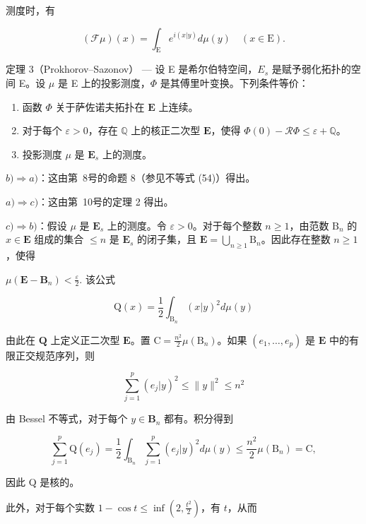 测度时，有

\[
(\mathcal {F} \mu) (x) = \int_ {\mathrm{E}} e ^ {i (x | y)} d \mu (y) \quad (x \in \mathrm{E}).\tag{64}
\]

定理 3（Prokhorov--Sazonov） --- 设 E 是希尔伯特空间，\(E_{s}\) 是赋予弱化拓扑的空间 E。设 \(\mu\) 是 E 上的投影测度，\(\Phi\) 是其傅里叶变换。下列条件等价：

\begin{enumerate}
\def\labelenumi{\alph{enumi})}
\item
  函数 \(\Phi\) 关于萨佐诺夫拓扑在 \(\mathbf{E}\) 上连续。
\item
  对于每个 \(\varepsilon > 0\)，存在 \(\mathbb{Q}\) 上的核正二次型 \(\mathbf{E}\)，使得 \(\Phi(0) - \mathcal{R}\Phi \leqslant \varepsilon + \mathbb{Q}\)。
\item
  投影测度 \(\mu\) 是 \(\mathbf{E}_s\) 上的测度。
\end{enumerate}

\(b) \Rightarrow a)\)：这由第~8号的命题 8（参见不等式 (54)）得出。

\(a) \Rightarrow c)\)：这由第~10号的定理 2 得出。

\(c) \Rightarrow b)\)：假设 \(\mu\) 是 \(\mathbf{E}_s\) 上的测度。令 \(\varepsilon > 0\)。对于每个整数 \(n \geqslant 1\)，由范数 \(\mathrm{B}_n\) 的 \(x \in \mathbf{E}\) 组成的集合 \(\leqslant n\) 是 \(\mathbf{E}_s\) 的闭子集，且 \(\mathbf{E} = \bigcup_{n \geqslant 1} \mathrm{B}_n\)。因此存在整数 \(n \geqslant 1\)，使得

\(\mu (\mathbf{E} - \mathbf{B}_n) <   \frac{\varepsilon}{2}.\) 该公式

\[
\mathrm{Q} (x) = \frac {1}{2} \int_ {\mathrm{B} _ {n}} (x | y) ^ {2} d \mu (y)\tag{65}
\]

由此在 \(\mathbf{Q}\) 上定义正二次型 \(\mathbf{E}\)。置 \(\mathrm{C} = \frac{n^2}{2}\mu (\mathrm{B}_n)\)。如果 \((e_1,\ldots ,e_p)\) 是 \(\mathbf{E}\) 中的有限正交规范序列，则

\[
\sum_ {j = 1} ^ {p} (e _ {j} | y) ^ {2} \leqslant \| y \| ^ {2} \leqslant n ^ {2}
\]

由 Bessel 不等式，对于每个 \(y \in \mathbf{B}_n\) 都有。积分得到

\[
\sum_ {j = 1} ^ {p} \mathrm{Q} (e _ {j}) = \frac {1}{2} \int_ {\mathrm{B} _ {n}} \sum_ {j = 1} ^ {p} (e _ {j} | y) ^ {2} d \mu (y) \leqslant \frac {n ^ {2}}{2} \mu (\mathrm{B} _ {n}) = \mathrm{C},
\]

因此 Q 是核的。

此外，对于每个实数 \(1 - \cos t \leqslant \inf \left(2, \frac{t^2}{2}\right)\)，有 \(t\)，从而

